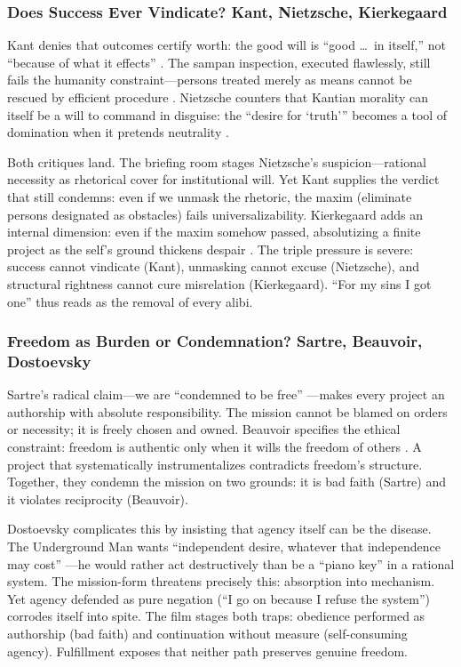\subsubsection*{Does Success Ever Vindicate? Kant, Nietzsche, Kierkegaard}

Kant denies that outcomes certify worth: the good will is ``good \ldots\ in itself,'' not 
``because of what it effects'' \parencite[p.~27]{KantGroundwork1996}. The sampan inspection, 
executed flawlessly, still fails the humanity constraint---persons treated merely as means 
cannot be rescued by efficient procedure \parencite[pp.~36--37]{KantCPrR1996}. Nietzsche 
counters that Kantian morality can itself be a will to command in disguise: the ``desire for 
`truth''' becomes a tool of domination when it pretends neutrality \parencite[\S 34]{NietzscheBGE1990}.

Both critiques land. The briefing room stages Nietzsche's suspicion---rational necessity as 
rhetorical cover for institutional will. Yet Kant supplies the verdict that still condemns: 
even if we unmask the rhetoric, the maxim (eliminate persons designated as obstacles) fails 
universalizability. Kierkegaard adds an internal dimension: even if the maxim somehow passed, 
absolutizing a finite project as the self's ground thickens despair 
\parencite[pp.~69--83]{KierkegaardSUD1980}. The triple pressure is severe: success cannot 
vindicate (Kant), unmasking cannot excuse (Nietzsche), and structural rightness cannot cure 
misrelation (Kierkegaard). ``For my sins I got one'' thus reads as the removal of every alibi.

\subsubsection*{Freedom as Burden or Condemnation? Sartre, Beauvoir, Dostoevsky}

Sartre's radical claim---we are ``condemned to be free'' \parencite[pp.~34--36]{SartreBN2003}---makes 
every project an authorship with absolute responsibility. The mission cannot be blamed on 
orders or necessity; it is freely chosen and owned. Beauvoir specifies the ethical constraint: 
freedom is authentic only when it wills the freedom of others \parencite[p.~73]{Beauvoir1976}. 
A project that systematically instrumentalizes contradicts freedom's structure. Together, they 
condemn the mission on two grounds: it is bad faith (Sartre) and it violates reciprocity 
(Beauvoir).

Dostoevsky complicates this by insisting that agency itself can be the disease. The 
Underground Man wants ``independent desire, whatever that independence may cost'' 
\parencite[p.~131]{DostoevskyNFU1994}---he would rather act destructively than be a ``piano 
key'' in a rational system. The mission-form threatens precisely this: absorption into 
mechanism. Yet agency defended as pure negation (``I go on because I refuse the system'') 
corrodes itself into spite. The film stages both traps: obedience performed as authorship 
(bad faith) and continuation without measure (self-consuming agency). Fulfillment exposes that 
neither path preserves genuine freedom.

